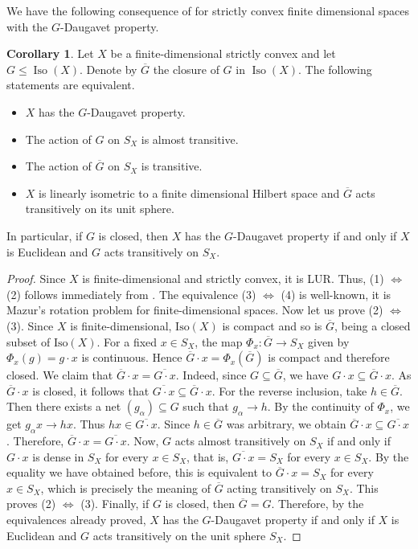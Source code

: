 \documentclass[a4paper,12pt]{amsart}
\theoremstyle{definition}
\newtheorem{corollary}[theorem]{Corollary}
\theoremstyle{definition}
\theoremstyle{remark}
\numberwithin{equation}{section}
\newcommand{\Iso}{\mathrm{Iso}}
\DeclareMathOperator{\iso}{Iso}
\newcommand{\<}{\langle}
\renewcommand{\>}{\rangle}
\begin{document}
	
	We have the following consequence of  for strictly convex finite dimensional spaces with the $G$-Daugavet property.
	
	\begin{corollary}\label{corollary:finite-dimensional-strictly-convex} Let $X$ be a finite-dimensional strictly convex and let $G \le \iso(X)$. Denote by $\overline{G}$ the closure of $G$ in $\iso(X)$. The following statements are equivalent.
		\begin{itemize}
			\item[(1)] $X$ has the $G$-Daugavet property.
			\item[(2)] The action of $G$ on $S_X$ is almost transitive.
			\item[(3)] The action of $\overline{G}$ on $S_X$ is transitive.
			\item[(4)] $X$ is linearly isometric to a finite dimensional Hilbert space and $\overline{G}$ acts transitively on its unit sphere.
		\end{itemize}
		In particular, if $G$ is closed, then $X$ has the $G$-Daugavet property if and only if $X$ is Euclidean and $G$ acts transitively on $S_X$.
	\end{corollary}
	
	\begin{proof} Since $X$ is finite-dimensional and strictly convex, it is LUR. Thus, (1) $\Leftrightarrow$ (2) follows immediately from . The equivalence (3) $\Leftrightarrow$ (4) is well-known, it is Mazur's rotation problem for finite-dimensional spaces. Now let us prove (2) $\Leftrightarrow$ (3). Since $X$ is finite-dimensional, $\Iso(X)$ is compact and so is $\overline{G}$, being a closed subset of $\Iso(X)$. For a fixed $x\in S_X$, the map $\Phi_x:\overline{G}\longrightarrow S_X$ given by $\Phi_x(g)=g\cdot x$ is continuous. Hence $\overline{G}\cdot x=\Phi_x(\overline{G})$ is compact and therefore closed. We claim that $\overline{G}\cdot x=\overline{G\cdot x}$. Indeed, since $G\subseteq \overline{G}$, we have $G\cdot x\subseteq \overline{G}\cdot x$. As $\overline{G}\cdot x$ is closed, it follows that $\overline{G\cdot x}\subseteq \overline{G}\cdot x$. For the reverse inclusion, take $h\in \overline{G}$. Then there exists a net $(g_\alpha)\subseteq G$ such that $g_\alpha\to h$. By the continuity of $\Phi_x$, we get $g_\alpha x\longrightarrow hx$. Thus $hx\in \overline{G\cdot x}$. Since $h\in \overline{G}$ was arbitrary, we obtain $\overline{G}\cdot x\subseteq \overline{G\cdot x}$. Therefore, $\overline{G}\cdot x=\overline{G\cdot x}$. Now, $G$ acts almost transitively on $S_X$ if and only if $G\cdot x$ is dense in $S_X$ for every $x\in S_X$, that is, $\overline{G\cdot x}=S_X$ for every $x\in S_X$. By the equality we have obtained before, this is equivalent to $\overline{G}\cdot x=S_X$ for every $x\in S_X$, which is precisely the meaning of $\overline{G}$ acting transitively on $S_X$. This proves (2) $\Leftrightarrow$ (3). Finally, if $G$ is closed, then $\overline{G}=G$. Therefore, by the equivalences already proved, $X$ has the $G$-Daugavet property if and only if $X$ is Euclidean and $G$ acts transitively on the unit sphere $S_X$.
	\end{proof}
	
\end{document}
